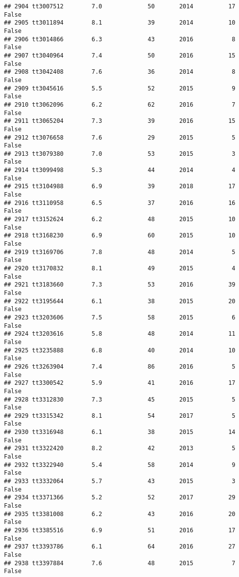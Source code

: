 \documentclass[
]{article}
\begin{document}
\begin{verbatim}
## 2904 tt3007512        7.0             50       2014          17   False
## 2905 tt3011894        8.1             39       2014          10   False
## 2906 tt3014866        6.3             43       2016           8   False
## 2907 tt3040964        7.4             50       2016          15   False
## 2908 tt3042408        7.6             36       2014           8   False
## 2909 tt3045616        5.5             52       2015           9   False
## 2910 tt3062096        6.2             62       2016           7   False
## 2911 tt3065204        7.3             39       2016          15   False
## 2912 tt3076658        7.6             29       2015           5   False
## 2913 tt3079380        7.0             53       2015           3   False
## 2914 tt3099498        5.3             44       2014           4   False
## 2915 tt3104988        6.9             39       2018          17   False
## 2916 tt3110958        6.5             37       2016          16   False
## 2917 tt3152624        6.2             48       2015          10   False
## 2918 tt3168230        6.9             60       2015          10   False
## 2919 tt3169706        7.8             48       2014           5   False
## 2920 tt3170832        8.1             49       2015           4   False
## 2921 tt3183660        7.3             53       2016          39   False
## 2922 tt3195644        6.1             38       2015          20   False
## 2923 tt3203606        7.5             58       2015           6   False
## 2924 tt3203616        5.8             48       2014          11   False
## 2925 tt3235888        6.8             40       2014          10   False
## 2926 tt3263904        7.4             86       2016           5   False
## 2927 tt3300542        5.9             41       2016          17   False
## 2928 tt3312830        7.3             45       2015           5   False
## 2929 tt3315342        8.1             54       2017           5   False
## 2930 tt3316948        6.1             38       2015          14   False
## 2931 tt3322420        8.2             42       2013           5   False
## 2932 tt3322940        5.4             58       2014           9   False
## 2933 tt3332064        5.7             43       2015           3   False
## 2934 tt3371366        5.2             52       2017          29   False
## 2935 tt3381008        6.2             43       2016          20   False
## 2936 tt3385516        6.9             51       2016          17   False
## 2937 tt3393786        6.1             64       2016          27   False
## 2938 tt3397884        7.6             48       2015           7   False

\end{verbatim}
\end{document}
